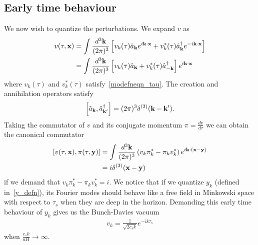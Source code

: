     \subsection{Early time behaviour}
    We now wish to quantize the perturbations. We expand $v$ as
    \begin{align}\label{operator_expansion}
        v(\tau,\mathbf{x}) &= \int\frac{d^3\mathbf{k}}{(2\pi)^3}\left[
            v_k(\tau)\hat{a}_{\mathbf{k}} e^{i\mathbf{k}\cdot\mathbf{x}}+
            v^*_k(\tau)\hat{a}^{\dagger}_{\mathbf{k}} e^{-i\mathbf{k}\cdot\mathbf{x}}
        \right]\\
            &= \int\frac{d^3\mathbf{k}}{(2\pi)^3}\left[
            v_k(\tau)\hat{a}_{\mathbf{k}} +
            v^*_k(\tau)\hat{a}^{\dagger}_{-\mathbf{k}}
        \right]e^{i\mathbf{k}\cdot\mathbf{x}}
    \end{align}
    where $v_k(\tau)$ and $v^*_k(\tau)$ satisfy~\eqref{modefneqn_tau}.
    The creation and annihilation operators satisfy
    \begin{align}\label{creation_annihilation_commutator}
        \left[\hat{a}_{\mathbf{k}},\hat{a}^{\dagger}_{\mathbf{k}'}\right] = (2\pi)^3\delta^{(3)}(\mathbf{k}-\mathbf{k}').
    \end{align}
    Taking the commutator of $v$ and its conjugate momentum $\pi=\frac{dv}{d\tau}$
    we can obtain the canonical commutator
    \begin{align}
        \left[v(\tau,\mathbf{x}),\pi(\tau,\mathbf{y})\right] &=
        \int \frac{d^3 \mathbf{k}}{(2\pi)^3}\left(v_k\pi^*_k-\pi_kv^*_k\right)e^{i\mathbf{k}\cdot(\mathbf{x}-\mathbf{y})}\\
        &= i \delta^{(3)}(\mathbf{x}-\mathbf{y})
    \end{align}
    if we demand that $v_k\pi^*_k-\pi_kv^*_k=i$.
    We notice that if we quantize $y_k$
    (defined in~\eqref{y_defn}), its Fourier modes
    should behave like a free field in Minkowski space with respect to $\tau_s$
    when they are deep in the horizon.
    Demanding this early time behaviour of $y_k$
    gives us the Bunch-Davies vacuum
    \begin{align}\label{bd_ic}
        v_k = \frac{1}{\sqrt{2{c_s}k}}e^{-ik\tau_s}
    \end{align}
    when $\frac{{c_s}k}{aH}\rightarrow \infty$.


